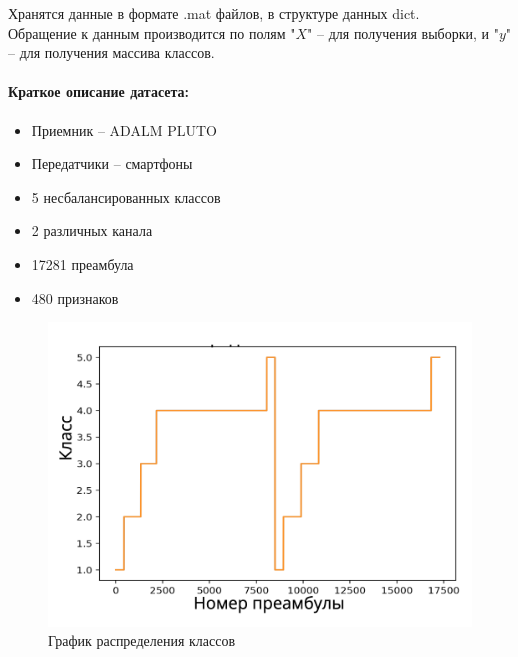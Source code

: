         Хранятся данные в формате .mat файлов, в структуре данных dict.\\ 
        Обращение к данным производится по полям "$X$" – для получения выборки, и "$y$" – для получения массива классов.
        
        \paragraph{Краткое описание датасета:}
        \begin{itemize}
            \item Приемник – ADALM PLUTO
            \item Передатчики – смартфоны
            \item 5 несбалансированных классов
            \item 2 различных канала
            \item 17281 преамбула
            \item 480 признаков
        \end{itemize}
        \begin{figure}[h!]
                \centering
                \includegraphics[scale=0.4]{pictures/target.png}
                \caption{График распределения классов}
                \label{fig:my_label}
            \end{figure} 
        \par
